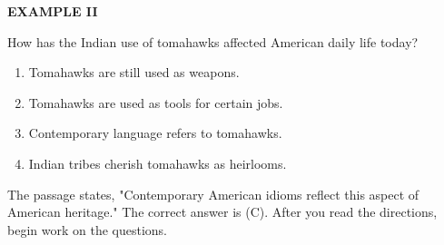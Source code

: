 \documentclass[12pt]{article}
\begin{document}
\begin{exampleblock}
\textbf{EXAMPLE II}\par
\noindent How has the Indian use of tomahawks affected American daily life today?
\begin{enumerate}[label=(\Alph*),leftmargin=*,itemsep=0.2em]
\item Tomahawks are still used as weapons.
\item Tomahawks are used as tools for certain jobs.
\item Contemporary language refers to tomahawks.
\item Indian tribes cherish tomahawks as heirlooms.
\end{enumerate}
\vspace{0.25\baselineskip}
The passage states, "Contemporary American idioms reflect this aspect of American heritage." The correct answer is (C). After you read the directions, begin work on the questions.\par
\end{exampleblock}
\end{document}
